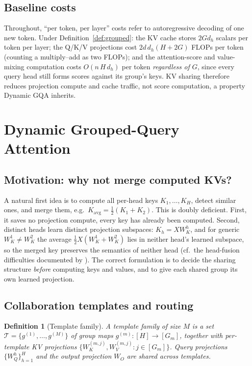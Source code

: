 \documentclass{article}
\newtheorem{definition}[theorem]{Definition}
\begin{document}
\subsection{Baseline costs}

Throughout, ``per token, per layer'' costs refer to autoregressive decoding
of one new token. Under Definition~\ref{def:grouped}:
the KV cache stores $2 G d_h$ scalars per token per layer; the Q/K/V
projections cost $2 d\, d_h (H + 2G)$ FLOPs per token (counting a
multiply--add as two FLOPs); and the attention-score and value-mixing
computation costs $O(n\, H\, d_h)$ per token \emph{regardless of $G$}, since
every query head still forms scores against its group's keys. KV sharing
therefore reduces projection compute and cache traffic, not score
computation, a property Dynamic GQA inherits.

\section{Dynamic Grouped-Query Attention}
\label{sec:method}

\subsection{Motivation: why not merge computed KVs?}

A natural first idea is to compute all per-head keys $K_1,\dots,K_H$, detect
similar ones, and merge them, e.g.\ $K_{\text{avg}} = \tfrac12(K_1 + K_2)$.
This is doubly deficient. First, it saves no projection compute, every key
has already been computed. Second, distinct heads learn distinct projection
subspaces: $K_h = X W_K^h$, and for generic $W_K^1 \neq W_K^2$ the average
$\tfrac12 X (W_K^1 + W_K^2)$ lies in neither head's learned subspace, so the
merged key preserves the semantics of neither head
(cf.\ the head-fusion difficulties documented by \citet{chen2024dha}). The
correct formulation is to decide the sharing structure \emph{before}
computing keys and values, and to give each shared group its own learned
projection.

\subsection{Collaboration templates and routing}

\begin{definition}[Template family]
\label{def:templates}
A \emph{template family} of size $M$ is a set
$\mathcal{T} = \{g^{(1)}, \dots, g^{(M)}\}$ of group maps
$g^{(m)} : [H] \to [G_m]$, together with per-template KV projections
$\{W_K^{(m,j)}, W_V^{(m,j)} : j \in [G_m]\}$. Query projections
$\{W_Q^h\}_{h=1}^H$ and the output projection $W_O$ are shared across
templates.
\end{definition}
\end{document}
